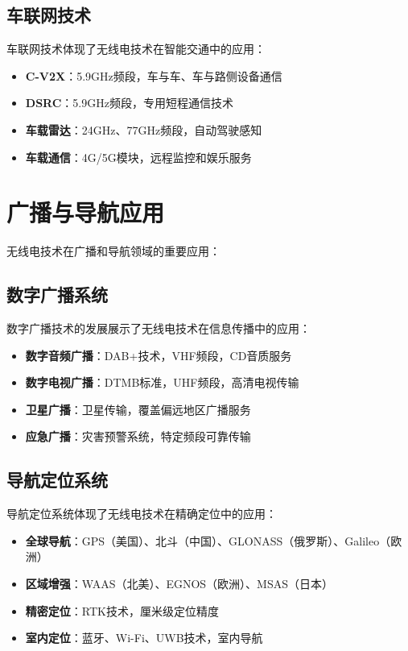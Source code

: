 \documentclass[12pt,UTF8]{ctexbook}
\begin{document}
\subsection{车联网技术}

车联网技术体现了无线电技术在智能交通中的应用：

\begin{itemize}[leftmargin=3.5em]
    \item \textbf{C-V2X}：5.9GHz频段，车与车、车与路侧设备通信
    \item \textbf{DSRC}：5.9GHz频段，专用短程通信技术
    \item \textbf{车载雷达}：24GHz、77GHz频段，自动驾驶感知
    \item \textbf{车载通信}：4G/5G模块，远程监控和娱乐服务
\end{itemize}

\section{广播与导航应用}

无线电技术在广播和导航领域的重要应用：

\subsection{数字广播系统}

数字广播技术的发展展示了无线电技术在信息传播中的应用：

\begin{itemize}[leftmargin=3.5em]
    \item \textbf{数字音频广播}：DAB+技术，VHF频段，CD音质服务
    \item \textbf{数字电视广播}：DTMB标准，UHF频段，高清电视传输
    \item \textbf{卫星广播}：卫星传输，覆盖偏远地区广播服务
    \item \textbf{应急广播}：灾害预警系统，特定频段可靠传输
\end{itemize}

\subsection{导航定位系统}

导航定位系统体现了无线电技术在精确定位中的应用：

\begin{itemize}[leftmargin=3.5em]
    \item \textbf{全球导航}：GPS（美国）、北斗（中国）、GLONASS（俄罗斯）、Galileo（欧洲）
    \item \textbf{区域增强}：WAAS（北美）、EGNOS（欧洲）、MSAS（日本）
    \item \textbf{精密定位}：RTK技术，厘米级定位精度
    \item \textbf{室内定位}：蓝牙、Wi-Fi、UWB技术，室内导航
\end{itemize}
\end{document}
